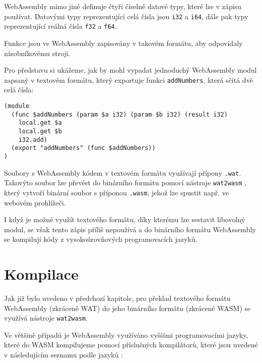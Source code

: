 \documentclass{{template/ctuthesis}}
\begin{document}
WebAssembly mimo jiné definuje čtyři číselné datové typy, které lze v zápisu používat. Datovými typy reprezentující celá čísla jsou \texttt{i32} a \texttt{i64}, dále pak typy reprezentující reálná čísla \texttt{f32} a \texttt{f64}.

Funkce jsou ve WebAssembly zapisovány v takovém formátu, aby odpovídaly zásobníkovému stroji.

Pro představu si ukážeme, jak by mohl vypadat jednoduchý WebAssembly modul zapsaný v textovém formátu, který exportuje funkci \texttt{addNumbers}, která sčítá dvě celá čísla:

\begin{verbatim}
(module
  (func $addNumbers (param $a i32) (param $b i32) (result i32)
    local.get $a
    local.get $b
    i32.add)
  (export "addNumbers" (func $addNumbers))
)
\end{verbatim}

Soubory s WebAssembly kódem v textovém formátu využívají přípony \texttt{.wat}. Takovýto soubor lze převést do binárního formátu pomocí nástroje \texttt{wat2wasm} \cite{wasm2wat}, který vytvoří binární soubor s příponou \texttt{.wasm}, jehož lze spustit např. ve webovém prohlížeči.

I když je možné využít textového formátu, díky kterému lze sestavit libovolný modul, se však tento zápis příliš nepoužívá a do binárního formátu WebAssembly se kompilují kódy z vysokoúrovňových programovacích jazyků. 


\section{Kompilace}

Jak již bylo uvedeno v předchozí kapitole, pro překlad textového formátu WebAssembly (zkráceně WAT) do jeho binárního formátu (zkráceně WASM) se využívá nástroje \texttt{wat2wasm}.

Ve většině případů je WebAssembly využíváno vyššími programovacími jazyky, které do WASM kompilujeme pomocí příslušných kompilátorů, které jsou uvedené v následujícím seznamu podle jazyků \cite{languages}:
\end{document}
